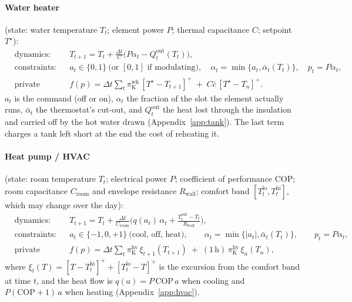 \documentclass[11pt,a4paper]{article}
\newcommand{\dt}{\Delta t}
\begin{document}
\paragraph{Water heater} (state: water temperature $T_t$; element power $P$;
thermal capacitance $C$; setpoint $T^\star$):
\begin{equation}
\begin{aligned}
  &\text{dynamics:}    && T_{t+1} = T_t + \tfrac{\dt}{C}\big(P\alpha_t - Q^{\mathrm{out}}_t(T_t)\big), \\
  &\text{constraints:} && a_t \in \{0,1\} \ \text{(or $[0,1]$ if modulating)}, \quad
                          \alpha_t = \min\{a_t, \bar\alpha_t(T_t)\}, \quad p_t = P\alpha_t, \\
  &\text{private cost:}&& f(p) = \dt\textstyle\sum_t \pi^{\mathrm{wh}}_{\mathrm K}\,[T^\star - T_{t+1}]^+ \;+\; C\bar c\,[T^\star - T_n]^+ .
\end{aligned}
\label{eq:tank}
\end{equation}
$a_t$ is the command (off or on), $\alpha_t$ the fraction of the slot the
element actually runs, $\bar\alpha_t$ the thermostat's cut-out, and
$Q^{\mathrm{out}}_t$ the heat lost through the insulation and carried off by the
hot water drawn (Appendix~\ref{app:tank}). The last
term charges a tank left short at the end the cost of reheating it.

\paragraph{Heat pump / HVAC} (state: room temperature $T_t$; electrical power
$P$; coefficient of performance $\mathrm{COP}$; room capacitance
$C_{\mathrm{room}}$ and envelope resistance $R_{\mathrm{wall}}$; comfort band
$[T^{\mathrm{lo}}_t, T^{\mathrm{hi}}_t]$, which may change over the day):
\begin{equation}
\begin{aligned}
  &\text{dynamics:}    && T_{t+1} = T_t + \tfrac{\dt}{C_{\mathrm{room}}}\Big(q(a_t)\,\alpha_t
                          + \tfrac{T^{\mathrm{out}}_t - T_t}{R_{\mathrm{wall}}}\Big), \\
  &\text{constraints:} && a_t \in \{-1, 0, +1\} \ \text{(cool, off, heat)}, \qquad
                          \alpha_t = \min\{|a_t|, \bar\alpha_t(T_t)\}, \qquad p_t = P\alpha_t, \\
  &\text{private cost:}&& f(p) = \dt\textstyle\sum_t \pi^{\mathrm{hv}}_{\mathrm K}\,\xi_{t+1}(T_{t+1})
                          \;+\; (1\,\mathrm h)\,\pi^{\mathrm{hv}}_{\mathrm K}\,\xi_n(T_n),
\end{aligned}
\label{eq:hvac}
\end{equation}
where $\xi_t(T) = [T - T^{\mathrm{hi}}_t]^+ + [T^{\mathrm{lo}}_t - T]^+$ is the
excursion from the comfort band at time $t$, and the heat flow is $q(a) = P\,\mathrm{COP}\,a$
when cooling and $P(\mathrm{COP}+1)\,a$ when heating (Appendix~\ref{app:hvac}).
\end{document}
